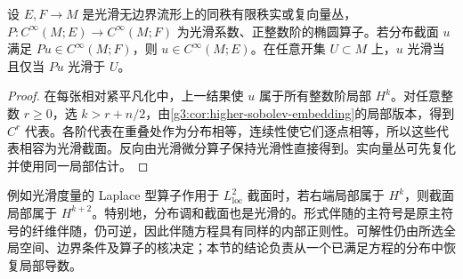 \begin{corollary}\label{g3:cor:elliptic-smoothness}
	设 \(E,F\to M\) 是光滑无边界流形上的同秩有限秩实或复向量丛，\(P:C^\infty(M;E)\to C^\infty(M;F)\) 为光滑系数、正整数阶的椭圆算子。若分布截面 \(u\) 满足 \(Pu\in C^\infty(M;F)\)，则 \(u\in C^\infty(M;E)\)。在任意开集 \(U\subset M\) 上，\(u\) 光滑当且仅当 \(Pu\) 光滑于 \(U\)。
\end{corollary}
\begin{proof}
	在每张相对紧平凡化中，上一结果使 \(u\) 属于所有整数阶局部 \(H^k\)。对任意整数 \(r\ge0\)，选 \(k>r+n/2\)，由\cref{g3:cor:higher-sobolev-embedding}的局部版本，得到 \(C^r\) 代表。各阶代表在重叠处作为分布相等，连续性使它们逐点相等，所以这些代表相容为光滑截面。反向由光滑微分算子保持光滑性直接得到。实向量丛可先复化并使用同一局部估计。
\end{proof}

例如光滑度量的 Laplace 型算子作用于 \(L^2_{\mathrm{loc}}\) 截面时，若右端局部属于 \(H^k\)，则截面局部属于 \(H^{k+2}\)。特别地，分布调和截面也是光滑的。形式伴随的主符号是原主符号的纤维伴随，仍可逆，因此伴随方程具有同样的内部正则性。可解性仍由所选全局空间、边界条件及算子的核决定；本节的结论负责从一个已满足方程的分布中恢复局部导数。


